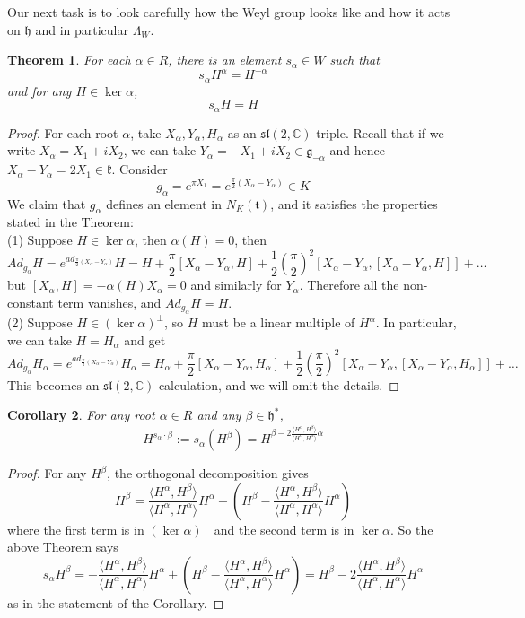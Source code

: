 \documentclass[11pt]{book}
\newtheorem{theorem}{Theorem}[section]
\newtheorem{corollary}[theorem]{Corollary}
\newcommand{\bb}[1]{\mathbb{#1}}
\newcommand{\mf}[1]{\mathfrak{#1}}
\begin{document}
\noindent Our next task is to look carefully how the Weyl group looks like and how it acts on $\mf{h}$ and in particular $\Lambda_W$.
\begin{theorem}
For each $\alpha \in R$, there is an element $s_{\alpha} \in W$ such that
$$s_{\alpha}H^{\alpha} = H^{-\alpha}$$
and for any $H \in \ker \alpha$,
$$s_{\alpha}H = H$$
\end{theorem}
\begin{proof}
For each root $\alpha$, take $X_{\alpha}, Y_{\alpha}, H_{\alpha}$ as an $\mf{sl}(2,\bb{C})$ triple. Recall that if we write $X_{\alpha} = X_1 + iX_2$, we can take $Y_{\alpha} = -X_1 + iX_2 \in \mf{g}_{-\alpha}$ and hence $X_{\alpha} - Y_{\alpha} = 2X_1 \in \mf{k}$. Consider
$$g_{\alpha} = e^{\pi X_1} = e^{\frac{\pi}{2}(X_{\alpha} - Y_{\alpha})} \in K$$
We claim that $g_{\alpha}$ defines an element in $N_K(\mf{t})$, and it satisfies the properties stated in the Theorem:\\
(1) Suppose $H \in \ker \alpha$, then $\alpha(H) = 0$, then
$$Ad_{g_{\alpha}}H = e^{ad_{\frac{\pi}{2}(X_{\alpha} - Y_{\alpha})}}H = H + \frac{\pi}{2}[X_{\alpha} - Y_{\alpha},H] + \frac{1}{2}(\frac{\pi}{2})^2[X_{\alpha} - Y_{\alpha},[X_{\alpha} - Y_{\alpha},H]] + \dots$$
but $[X_{\alpha},H] = -\alpha(H)X_{\alpha} = 0$ and similarly for $Y_{\alpha}$. Therefore all the non-constant term vanishes, and $Ad_{g_{\alpha}}H = H$.\\
(2) Suppose $H \in (\ker \alpha)^{\perp}$, so $H$ must be a linear multiple of $H^{\alpha}$. In particular, we can take $H = H_{\alpha}$ and get
$$Ad_{g_{\alpha}}H_{\alpha} = e^{ad_{\frac{\pi}{2}(X_{\alpha} - Y_{\alpha})}}H_{\alpha} = H_{\alpha} + \frac{\pi}{2}[X_{\alpha} - Y_{\alpha},H_{\alpha}] + \frac{1}{2}(\frac{\pi}{2})^2[X_{\alpha} - Y_{\alpha},[X_{\alpha} - Y_{\alpha},H_{\alpha}]] + \dots$$
This becomes an $\mf{sl}(2,\bb{C})$ calculation, and we will omit the details.
\end{proof}

\begin{corollary}
For any root $\alpha \in R$ and any $\beta \in \mf{h}^*$,
$$H^{s_{\alpha} \cdot \beta} := s_{\alpha}(H^{\beta}) = H^{\beta - 2\frac{ \langle H^{\alpha}, H^{\beta} \rangle}{ \langle H^{\alpha}, H^{\alpha} \rangle} \alpha} $$
\end{corollary}
\begin{proof}
For any $H^{\beta}$, the orthogonal decomposition gives
$$H^{\beta} = \frac{\langle H^{\alpha}, H^{\beta} \rangle}{ \langle H^{\alpha}, H^{\alpha} \rangle} H^{\alpha} + (H^{\beta} - \frac{\langle H^{\alpha}, H^{\beta} \rangle}{ \langle H^{\alpha}, H^{\alpha} \rangle} H^{\alpha})$$
where the first term is in $(\ker \alpha)^{\perp}$ and the second term is in $\ker \alpha$. So the above Theorem says
$$s_{\alpha}H^{\beta} = -\frac{\langle H^{\alpha}, H^{\beta} \rangle}{ \langle H^{\alpha}, H^{\alpha} \rangle} H^{\alpha} + (H^{\beta} - \frac{\langle H^{\alpha}, H^{\beta} \rangle}{ \langle H^{\alpha}, H^{\alpha} \rangle} H^{\alpha}) = H^{\beta} - 2\frac{\langle H^{\alpha}, H^{\beta} \rangle}{ \langle H^{\alpha}, H^{\alpha} \rangle} H^{\alpha}$$
as in the statement of the Corollary.
\end{proof}
\end{document}
